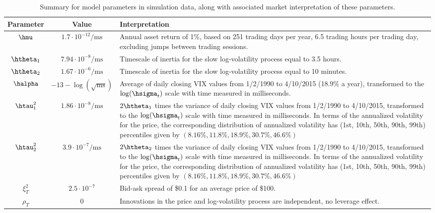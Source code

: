 \begin{table}[h!]
\begin{center}
\begin{tabular}{c!{\color{black}\vrule}c!{\color{black}\vrule}p{8.5cm}}
  Parameter & Value & Interpretation \\ \hline
  $\hmu$ & $1.7 \cdot 10^{-12}/\mbox{ms}$ & Annual asset return of 1\%, based on 251 trading days per year, 6.5 trading hours per trading day, excluding jumps between trading sessions. \\ \hline
  $\htheta_1$ & $7.94 \cdot 10^{-8}/\mbox{ms}$ & Timescale of inertia for the slow log-volatility process equal to 3.5 hours. \\ \hline
  $\htheta_2$ & $1.67 \cdot 10^{-6}/\mbox{ms}$ & Timescale of inertia for the slow log-volatility process equal to 10 minutes. \\ \hline
  $\halpha$ & $-13-\log(\sqrt{\mbox{ms}})$ & Average of daily closing VIX values from 1/2/1990 to 4/10/2015 (18.9\% a year), transformed to the $\log(\hsigma_t)$ scale with time measured in milliseconds. \\ \hline
  $\htau^2_1$ & $1.86 \cdot 10^{-8}/\mbox{ms}$ & $2\htheta_1$ times the variance of daily closing VIX values from 1/2/1990 to 4/10/2015, transformed to the $\log(\hsigma_t)$ scale with time measured in milliseconds. In terms of the annualized volatility for the price, the corresponding distribution of annualized volatility has (1st, 10th, 50th, 90th, 99th) percentiles given by $( 8.16 \%, 11.8\%, 18.9\%, 30.7\%, 46.6\%)$\\ \hline
    $\htau^2_2$ & $3.9 \cdot 10^{-7}/\mbox{ms}$ & $2\htheta_2$ times the variance of daily closing VIX values from 1/2/1990 to 4/10/2015, transformed to the $\log(\hsigma_t)$ scale with time measured in milliseconds. In terms of the annualized volatility for the price, the corresponding distribution of annualized volatility has (1st, 10th, 50th, 90th, 99th) percentiles given by $( 8.16 \%, 11.8\%, 18.9\%, 30.7\%, 46.6\%)$\\ \hline
  $\xi^2_T$ & $2.5 \cdot 10^{-7}$ & Bid-ask spread of \$0.1 for an average price of \$100. \\ \hline
  $\rho_T$ & 0 & Innovations in the price and log-volatility process are independent, no leverage effect.
\end{tabular}
\caption{Summary for model parameters in simulation data, along with associated market interpretation of these parameters.}\label{ta:simulation-parameters}
\end{center}
\end{table}

